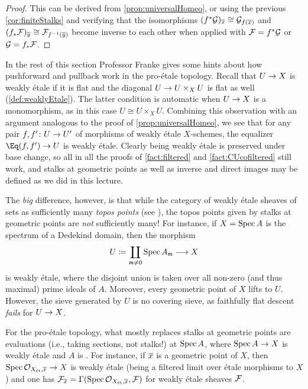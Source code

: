 \begin{proof}
	This can be derived from \cref{prop:universalHomeo}, or using the previous \cref{cor:finiteStalks} and verifying that the isomorphisms $(f^*\Gg)_{\ov{x}}\cong \Gg_{f(\ov{x})}$ and $(f_*\Ff)_{\ov{y}}\cong \Ff_{f^{-1}(\ov{y})}$ become inverse to each other when applied with $\mathcal{F}=f^*\mathcal{G}$ or $\mathcal{G}=f_*\mathcal{F}$.
\end{proof}
In the rest of this section Professor Franke gives some hints about how pushforward and pullback work in the pro-étale topology. Recall that $U\morphism X$ is weakly étale if it is flat and the diagonal $U\morphism U\times_XU$ is flat as well (\cref{def:weaklyEtale}). The latter condition is automatic when $U\morphism X$ is a monomorphism, as in this case $U\cong U\times_XU$. Combining this observation with an argument analogous to the proof of \cref{prop:universalHomeo}, we see that for any pair $f,f'\colon U\morphism U'$ of morphisms of weakly étale $X$-schemes, the equalizer $\Eq(f,f')\morphism U$ is weakly étale. Clearly being weakly étale is preserved under base change, so all in all the proofs of \cref{fact:filtered} and \cref{fact:CUcofiltered} still work, and stalks at geometric points as well as inverse and direct images may be defined as we did in this lecture.

The \emph{big} difference, however, is that while the category of weakly étale sheaves of sets as sufficiently many \emph{topos points} (see \cite[]{stacks-project}), the topos points given by stalks at geometric points are \emph{not} sufficiently many! For instance, if $X=\operatorname{Spec} A$ is the spectrum of a Dedekind domain, then the morphism
\begin{equation*}
	U\coloneqq\coprod_{\mm\neq 0}\Spec A_\mm\morphism X
\end{equation*}
is weakly étale, where the disjoint union is taken over all non-zero (and thus maximal) prime ideals of $A$. Moreover, every geometric point of $X$ lifts to $U$. However, the sieve generated by $U$ is no covering sieve, as faithfully flat descent \emph{fails} for $U\morphism X$.

For the pro-étale topology, what mostly replaces stalks at geometric points are evaluations (i.e., taking sections, not stalks!) at $\operatorname{Spec} A$, where $\Spec A\morphism X$ is weakly étale and $A$ is . For instance, if $\ov{x}$ is a geometric point of $X$,  then $\Spec \Oo_{X_\et,\ov{x}}\morphism X$ is weakly étale (being a filtered limit over étale morphisms to $X$) and one has $\Ff_{\ov{x}}=\Global(\Spec \Oo_{X_\et,\ov{x}},\Ff)$ for weakly étale sheaves $\mathcal{F}$.

